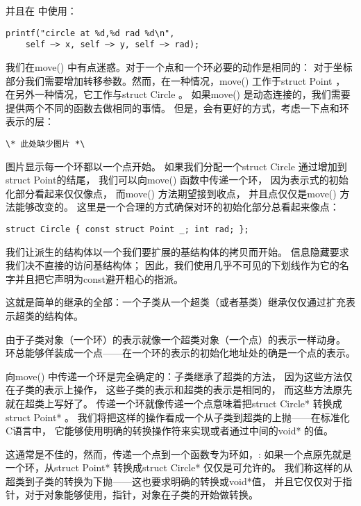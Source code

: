 并且在 中使用：
\begin{lstlisting}
printf("circle at %d,%d rad %d\n",
    self —> x, self —> y, self —> rad);
\end{lstlisting}

我们在move() 中有点迷惑。对于一个点和一个环必要的动作是相同的：
对于坐标部分我们需要增加转移参数。然而，在一种情况，move() 工作于struct Point ，
在另外一种情况，它工作与struct Circle 。
如果move() 是动态连接的，我们需要提供两个不同的函数去做相同的事情。
但是，会有更好的方式，考虑一下点和环表示的层：
\begin{lstlisting}
\* 此处缺少图片 *\
\end{lstlisting}

图片显示每一个环都以一个点开始。
如果我们分配一个struct Circle 通过增加到struct Point的结尾，
我们可以向move() 函数中传递一个环，
因为表示式的初始化部分看起来仅仅像点，
而move() 方法期望接到收点，
并且点仅仅是move() 方法能够改变的。
这里是一个合理的方式确保对环的初始化部分总看起来像点：
\begin{lstlisting}
struct Circle { const struct Point _; int rad; };
\end{lstlisting}

我们让派生的结构体以一个我们要扩展的基结构体的拷贝而开始。
信息隐藏要求我们决不直接的访问基结构体；
因此，我们使用几乎不可见的下划线作为它的名字并且把它声明为const避开粗心的指派。

这就是简单的继承的全部：一个子类从一个超类（或者基类）继承仅仅通过扩充表示超类的结构体。

由于子类对象（一个环）的表示就像一个超类对象（一个点）的表示一样动身。
环总能够佯装成一个点——在一个环的表示的初始化地址处的确是一个点的表示。

向move() 中传递一个环是完全确定的：子类继承了超类的方法，
因为这些方法仅在子类的表示上操作，
这些子类的表示和超类的表示是相同的，
而这些方法原先就在超类上写好了。
传递一个环就像传递一个点意味着把struct Circle* 转换成struct Point* 。
我们将把这样的操作看成一个从子类到超类的上抛——在标准化C语言中，
它能够使用明确的转换操作符来实现或者通过中间的void* 的值。

这通常是不佳的，然而，传递一个点到一个函数专为环如，: 
如果一个点原先就是一个环，从struct Point* 转换成struct Circle* 仅仅是可允许的。
我们称这样的从超类到子类的转换为下抛——这也要求明确的转换或void*值，
并且它仅仅对于指针，对于对象能够使用，指针，对象在子类的开始做转换。

